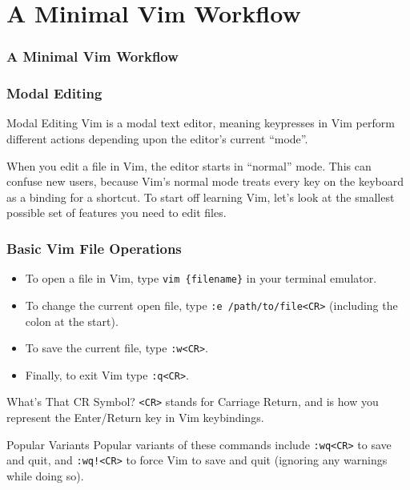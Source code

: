 \documentclass{beamer}
\begin{document}
\section{A Minimal Vim Workflow}

\begin{frame}[fragile]
    \frametitle{A Minimal Vim Workflow}
    \tableofcontents[currentsection]
\end{frame}

\begin{frame}[fragile]
    \frametitle{Modal Editing}
    \small
    \begin{block}{Modal Editing}
	Vim is a modal text editor, meaning keypresses in Vim perform different actions depending upon the editor's current \enquote{mode}.\\
    \end{block}
    When you edit a file in Vim, the editor starts in \enquote{normal} mode. This can confuse new users, because Vim's normal mode treats every key on the keyboard as a binding for a shortcut. To start off learning Vim, let's look at the smallest possible set of features you need to edit files.
\end{frame}

\begin{frame}[fragile]
    \frametitle{Basic Vim File Operations}
    \small
    \begin{itemize}
	\item To open a file in Vim, type \verb+vim {filename}+ in your terminal emulator.
	\item To change the current open file, type \verb+:e /path/to/file<CR>+ (including the colon at the start).
	\item To save the current file, type \verb+:w<CR>+.
	\item Finally, to exit Vim type \verb+:q<CR>+.
    \end{itemize}
    \begin{block}{What's That CR Symbol?}
	\verb+<CR>+ stands for Carriage Return, and is how you represent the Enter/Return key in Vim keybindings.
    \end{block}
    \begin{block}{Popular Variants}
	Popular variants of these commands include \verb+:wq<CR>+ to save and quit, and \verb+:wq!<CR>+ to force Vim to save and quit (ignoring any warnings while doing so).
    \end{block}
\end{frame}
\end{document}
